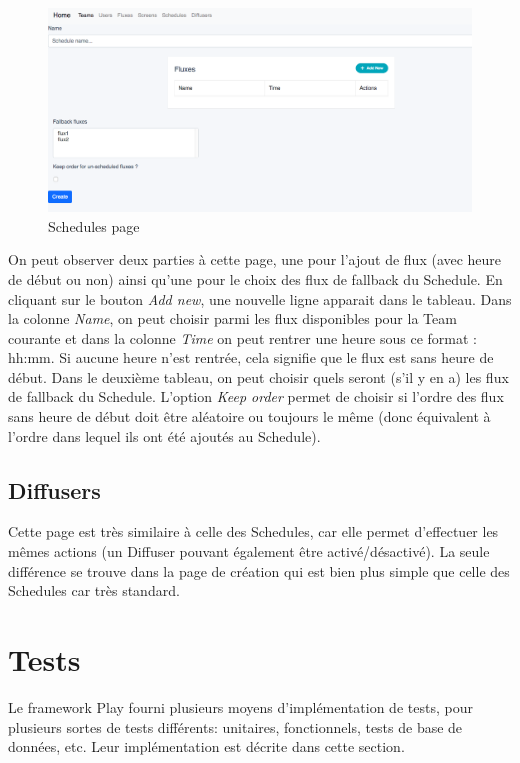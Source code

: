 \documentclass[french]{article}
\begin{document}
\begin{figure}[h]
	\centering	
	\includegraphics[width=0.8\linewidth]{interface/schedulepage_creation.png}%
	\caption{Schedules page}
\end{figure} 

On peut observer deux parties à cette page, une pour l'ajout de flux (avec heure de début ou non) ainsi qu'une pour le choix des flux de fallback du Schedule. En cliquant sur le bouton \textit{Add new}, une nouvelle ligne apparait dans le tableau. Dans la colonne \textit{Name}, on peut choisir parmi les flux disponibles pour la Team courante et dans la colonne \textit{Time} on peut rentrer une heure sous ce format : hh:mm. Si aucune heure n'est rentrée, cela signifie que le flux est sans heure de début.\newline
Dans le deuxième tableau, on peut choisir quels seront (s'il y en a) les flux de fallback du Schedule. L'option \textit{Keep order} permet de choisir si l'ordre des flux sans heure de début doit être aléatoire ou toujours le même (donc équivalent à l'ordre dans lequel ils ont été ajoutés au Schedule).

\subsection{Diffusers}

Cette page est très similaire à celle des Schedules, car elle permet d'effectuer les mêmes actions (un Diffuser pouvant également être activé/désactivé). La seule différence se trouve dans la page de création qui est bien plus simple que celle des Schedules car très standard.

\newpage
\section{Tests}

Le framework Play fourni plusieurs moyens d'implémentation de tests, pour plusieurs sortes de tests différents: unitaires, fonctionnels, tests de base de données, etc. Leur implémentation est décrite dans cette section.
\end{document}
